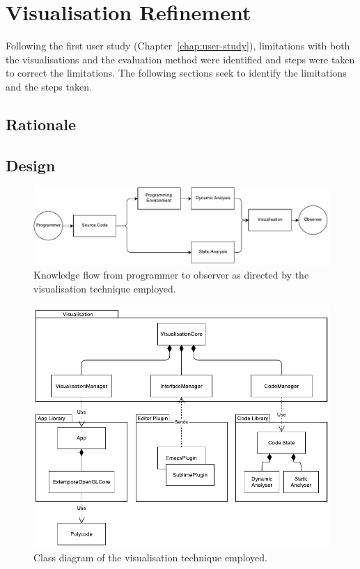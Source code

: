 
\chapter{Visualisation Refinement}
\label{chap:visualisation-refinement}

Following the first user study (Chapter~\ref{chap:user-study}), limitations with both the visualisations and the evaluation method were identified and steps were taken to correct the limitations. The following sections seek to identify the limitations and the steps taken.

\section{Rationale}



\section{Design}

\begin{figure}
  \centering \includegraphics[width=\columnwidth]{../images/diagrams/knowledge-flow-refined.pdf}
  \caption{Knowledge flow from programmer to observer as directed by the visualisation technique employed.}
\label{fig:knowledge-flow-refined}
\end{figure}

\begin{figure}
  \centering \includegraphics[width=\columnwidth]{../images/diagrams/visualisation-class-diagram}
  \caption{Class diagram of the visualisation technique employed.}
\label{fig:visualisation-class-diagram}
\end{figure}

